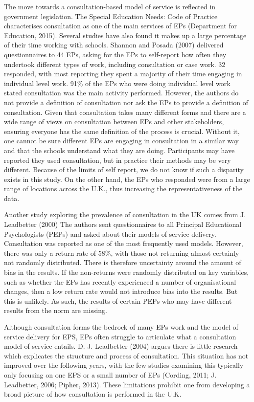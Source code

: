 \documentclass[
  english,
  man]{apa}
\begin{document}
The move towards a consultation-based model of service is reflected in government legislation. The Special Education Needs: Code of Practice characterises consultation as one of the main services of EPs (Department for Education, 2015). Several studies have also found it makes up a large percentage of their time working with schools. Shannon and Posada (2007) delivered questionnaires to 44 EPs, asking for the EPs to self-report how often they undertook different types of work, including consultation or case work. 32 responded, with most reporting they spent a majority of their time engaging in individual level work. 91\% of the EPs who were doing individual level work stated consultation was the main activity performed. However, the authors do not provide a definition of consultation nor ask the EPs to provide a definition of consultation. Given that consultation takes many different forms and there are a wide range of views on consultation between EPs and other stakeholders, ensuring everyone has the same definition of the process is crucial. Without it, one cannot be sure different EPs are engaging in consultation in a similar way and that the schools understand what they are doing. Participants may have reported they used consultation, but in practice their methods may be very different. Because of the limits of self report, we do not know if such a disparity exists in this study. On the other hand, the EPs who responded were from a large range of locations across the U.K., thus increasing the representativeness of the data.

Another study exploring the prevalence of consultation in the UK comes from J. Leadbetter (2000) The authors sent questionnaires to all Principal Educational Psychologists (PEPs) and asked about their models of service delivery. Consultation was reported as one of the most frequently used models. However, there was only a return rate of 58\%, with those not returning almost certainly not randomly distributed. There is therefore uncertainty around the amount of bias in the results. If the non-returns were randomly distributed on key variables, such as whether the EPs has recently experienced a number of organisational changes, then a low return rate would not introduce bias into the results. But this is unlikely. As such, the results of certain PEPs who may have different results from the norm are missing.

Although consultation forms the bedrock of many EPs work and the model of service delivery for EPS, EPs often struggle to articulate what a consultation model of service entails. D. J. Leadbetter (2004) argues there is little research which explicates the structure and process of consultation. This situation has not improved over the following years, with the few studies examining this typically only focusing on one EPS or a small number of EPs (Cording, 2011; J. Leadbetter, 2006; Pipher, 2013). These limitations prohibit one from developing a broad picture of how consultation is performed in the U.K.
\end{document}
